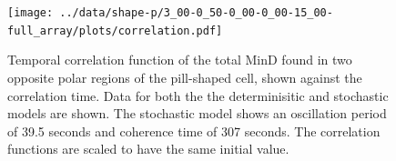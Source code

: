 \documentclass[letterpaper,twocolumn,amsmath,amssymb,pre]{revtex4-1}
\newcommand{\red}[1]{{\bf \color{red} #1}}
\newcommand{\fixme}[1]{\red{[#1]}}
\begin{document}


\begin{figure}
  \texttt{[image: ../data/shape-p/3\_00-0\_50-0\_00-0\_00-15\_00-full\_array/plots/correlation.pdf]}
  \caption{Temporal correlation function of the total MinD found in
    two opposite polar regions of the pill-shaped cell, shown against
    the correlation time.  Data for both the the determinisitic and
    stochastic models are shown.  The stochastic model shows an
    oscillation period of 39.5 seconds and coherence time of 307 seconds.
    The correlation functions are scaled to have the same initial
    value.}
  \label{corr-pill}
\end{figure}
\end{document}
